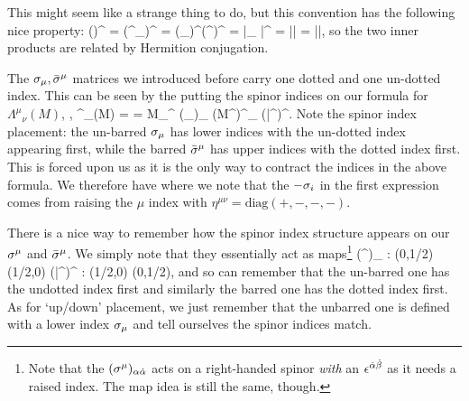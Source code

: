 \noindent This might seem like a strange thing to do, but this convention has the following nice property:
\bse 
    (\psi\chi)^{\dagger} = \big(\psi^{\a}\chi_{\a}\big)^{\dagger} = (\chi_{\a})^{\dagger}(\psi^{\a})^{\dagger} = \bar{\chi}_{\dot{\a}} \bar{\psi}^{\dot{\a}} = \bar{\chi}\bar{\psi} = \bar{\psi}\bar{\chi},
\ese 
so the two inner products are related by Hermition conjugation. 

The $\sigma_{\mu}, \bar{\sigma}^{\mu}$ matrices we introduced before carry one dotted and one un-dotted index. This can be seen by the putting the spinor indices on our formula for ${\Lambda^{\mu}}_{\nu}(M)$, , 
\bse 
    {\Lambda^{\mu}}_{\nu}(M) =  =  {M_{\a}}^{\beta} (\sig_{\nu})_{\beta\dot{\beta}} {(M^{\dagger})^{\dot{\beta}}}_{\dot{\g}} (\bar{\sig}^{\mu})^{\dot{\g}\a}. 
\ese 
Note the spinor index placement: the un-barred $\sigma_{\mu}$ has lower indices with the un-dotted index appearing first, while the barred $\bar{\sigma}^{\mu}$ has upper indices with the dotted index first. This is forced upon us as it is the only way to contract the indices in the above formula. We therefore have
\noindent where we note that the $-\sigma_i$ in the first expression comes from raising the $\mu$ index with $\eta^{\mu\nu}=\text{diag}(+,-,-,-)$. 

\br 
\label{rem:SigmaMapping}
    There is a nice way to remember how the spinor index structure appears on our $\sigma^{\mu}$ and $\bar{\sigma}^{\mu}$. We simply note that they essentially act as maps\footnote{Note that the $(\sigma^{\mu})_{\alpha\dot{\alpha}}$ acts on a right-handed spinor \textit{with} an $\epsilon^{\dot{\alpha}\dot{\beta}}$ as it needs a raised index. The map idea is still the same, though.}  
    \bse 
        (\sig^{\mu})_{\a\dot{\a}} : (0,1/2) \to (1/2,0) \qand (\bar{\sig}^{\mu})^{\dot{\a}\a} : (1/2,0) \to (0,1/2),
    \ese 
    and so can remember that the un-barred one has the undotted index first and similarly the barred one has the dotted index first. As for `up/down' placement, we just remember that the unbarred one is defined with a lower index $\sigma_{\mu}$ and tell ourselves the spinor indices match. 
\er 

